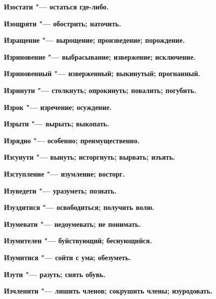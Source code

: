 \begin{mymulticols}{2}
\bfseries Изостати\normalfont{} "--- остаться где-либо. 




\bfseries Изощряти\normalfont{} "--- обострить; наточить. 




\bfseries Изращение\normalfont{} "--- вырощение; произведение; порождение. 




\bfseries Изриновение\normalfont{} "--- выбрасывание; извержение; исключение. 




\bfseries Изриновенный\normalfont{} "--- изверженный; выкинутый; прогнанный. 




\bfseries Изринути\normalfont{} "--- столкнуть; опрокинуть; повалить; погубить. 




\bfseries Изрок\normalfont{} "--- изречение; осуждение. 




\bfseries Изрыти\normalfont{} "--- вырыть; выкопать. 




\bfseries Изрядно\normalfont{} "--- особенно; преимущественно. 




\bfseries Изсунути\normalfont{} "--- вынуть; исторгнуть; вырвать; изъять. 




\bfseries Изступление\normalfont{} "--- изумление; восторг. 




\bfseries Изуведети\normalfont{} "--- уразуметь; познать. 




\bfseries Изуздитися\normalfont{} "--- освободиться; получить волю. 




\bfseries Изумевати\normalfont{} "--- недоумевать; не понимать. 




\bfseries Изумителен\normalfont{} "--- буйствующий; беснующийся. 




\bfseries Изумитися\normalfont{} "--- сойти с ума; обезуметь. 




\bfseries Изути\normalfont{} "--- разуть; снять обувь. 




\bfseries Изчленити\normalfont{} "--- лишить членов; сокрушить члены; изуродовать. 





\end{mymulticols}
